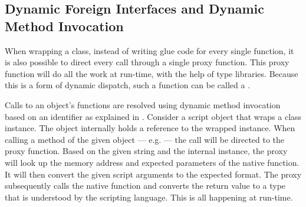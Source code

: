 
\subsection{Dynamic Foreign Interfaces and Dynamic Method Invocation}
\label{sec:DynamicForeignInterfaces}

When wrapping a class, instead of writing glue code for every single function, it is also possible to direct every call through a single proxy function. This proxy function will do all the work at run-time, with the help of type libraries. Because this is a form of dynamic dispatch, such a function can be called a .

Calls to an object's functions are resolved using dynamic method invocation based on an identifier as explained in . Consider a script object that wraps a class instance. The object internally holds a reference to the wrapped instance. When calling a method of the given object --- e.g.  --- the call will be directed to the proxy function. Based on the given string  and the internal instance, the proxy will look up the memory address and expected parameters of the native function. It will then convert the given script arguments to the expected format. The proxy subsequently calls the native function and converts the return value to a type that is understood by the scripting language. This is all happening at run-time.

